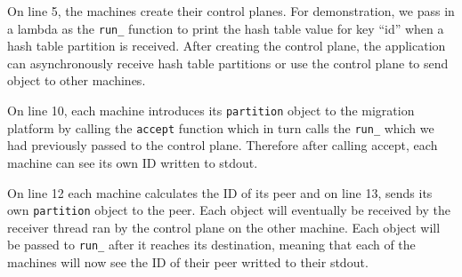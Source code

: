 On line 5, the machines create their
control planes. For demonstration, we pass in a lambda as the \texttt{run\_}
function to print the hash table value for key ``id'' when a hash table
partition is received. After creating the control plane, the application can
asynchronously receive hash table partitions or use the control plane to
send object to other machines.

On line 10, each machine introduces its \texttt{partition} object to the
migration platform by calling the \texttt{accept} function which in turn calls
the \texttt{run\_} which we had previously passed to the control plane. Therefore
after calling accept, each machine can see its own ID written to stdout.

On line 12 each machine calculates the ID of its peer and on line 13, sends
its own \texttt{partition} object to the peer. Each object will eventually be
received by the receiver thread ran by the control plane on the other machine.
Each object will be passed to \texttt{run\_} after it reaches its destination,
meaning that each of the machines will now see the ID of their peer writted
to their stdout.
